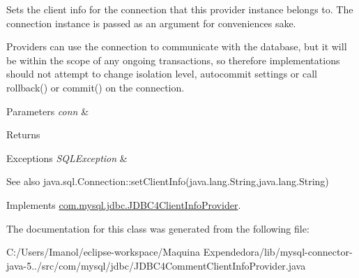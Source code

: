 Sets the client info for the connection that this provider instance belongs to. The connection instance is passed as an argument for convenience\textquotesingle{}s sake.

Providers can use the connection to communicate with the database, but it will be within the scope of any ongoing transactions, so therefore implementations should not attempt to change isolation level, autocommit settings or call rollback() or commit() on the connection.


\begin{DoxyParams}{Parameters}
{\em conn} & \\
\hline
\end{DoxyParams}
\begin{DoxyReturn}{Returns}

\end{DoxyReturn}

\begin{DoxyExceptions}{Exceptions}
{\em S\+Q\+L\+Exception} & \\
\hline
\end{DoxyExceptions}
\begin{DoxySeeAlso}{See also}
java.\+sql.\+Connection\+::set\+Client\+Info(java.\+lang.\+String,java.\+lang.\+String) 
\end{DoxySeeAlso}


Implements \mbox{\hyperlink{interfacecom_1_1mysql_1_1jdbc_1_1_j_d_b_c4_client_info_provider_ac4916282e520bf06380444e4703ae389}{com.\+mysql.\+jdbc.\+J\+D\+B\+C4\+Client\+Info\+Provider}}.



The documentation for this class was generated from the following file\+:\begin{DoxyCompactItemize}
\item 
C\+:/\+Users/\+Imanol/eclipse-\/workspace/\+Maquina Expendedora/lib/mysql-\/connector-\/java-\/5../src/com/mysql/jdbc/J\+D\+B\+C4\+Comment\+Client\+Info\+Provider.\+java\end{DoxyCompactItemize}
